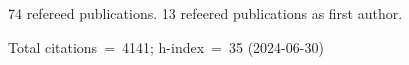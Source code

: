 74 refereed publications. 13 refeered publications as first author.

Total citations~=~4141; h-index~=~35 (2024-06-30)